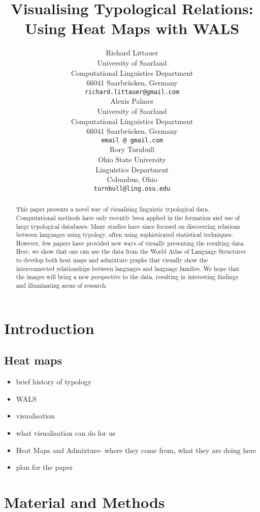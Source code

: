 \documentclass[11pt]{article}
\title{Visualising Typological Relations: Using Heat Maps with WALS}
\author{Richard Littauer \\
University of Saarland\\
Computational Linguistics Department\\
66041 Saarbr\"ucken, Germany\\
  {\tt richard.littauer@gmail.com} \\\And
Alexis Palmer\\
University of Saarland\\
Computational Linguistics Department\\
66041 Saarbr\"ucken, Germany\\
  {\tt email @ gmail.com} \\\And
Rory Turnbull \\
Ohio State University\\
Linguistics Department\\
Columbus, Ohio\\
  {\tt turnbull@ling.osu.edu} \\}
\date{}
\begin{document}
\maketitle
\begin{abstract}
This paper presents a novel way of visualising linguistic typological data. Computational methods have only recently been applied in the formation and use of large typological databases. Many studies have since focused on discovering relations between languages using typology, often using sophisticated statistical techniques. However, few papers have provided new ways of visually presenting the resulting data. Here, we show that one can use the data from the World Atlas of Language Structures\cite{wals-2011} to develop both heat maps and admixture graphs that visually show the interconnected relationships between languages and language families. We hope that the images will bring a new perspective to the data, resulting in interesting findings and illuminating areas of research.
\end{abstract}


\section{Introduction}
\subsection{Heat maps}
\begin{itemize}
\item brief history of typology
\item WALS
\item visualisation
\item what visualisation can do for us
\item Heat Maps and Admixture-  where they come from, what they are doing here
\item plan for the paper
\end{itemize}

\section{Material and Methods}
\end{document}
